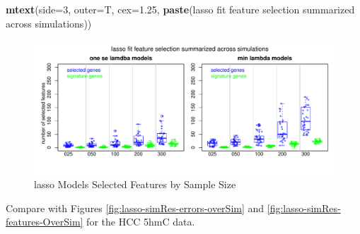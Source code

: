 \documentclass[
]{book}
\newenvironment{Shaded}{\begin{snugshade}}{\end{snugshade}}
\newcommand{\DataTypeTok}[1]{\textcolor[rgb]{0.13,0.29,0.53}{#1}}
\newcommand{\DecValTok}[1]{\textcolor[rgb]{0.00,0.00,0.81}{#1}}
\newcommand{\FloatTok}[1]{\textcolor[rgb]{0.00,0.00,0.81}{#1}}
\newcommand{\KeywordTok}[1]{\textcolor[rgb]{0.13,0.29,0.53}{\textbf{#1}}}
\newcommand{\NormalTok}[1]{#1}
\newcommand{\StringTok}[1]{\textcolor[rgb]{0.31,0.60,0.02}{#1}}
\begin{document}
\begin{Shaded}
\begin{Highlighting}[]
\KeywordTok{mtext}\NormalTok{(}\DataTypeTok{side=}\DecValTok{3}\NormalTok{, }\DataTypeTok{outer=}\NormalTok{T, }\DataTypeTok{cex=}\FloatTok{1.25}\NormalTok{, }\KeywordTok{paste}\NormalTok{(}\StringTok{\textquotesingle{}lasso fit feature selection summarized across simulations\textquotesingle{}}\NormalTok{))}
\end{Highlighting}
\end{Shaded}

\begin{figure}
\centering
\includegraphics{Static/figures/brca-rnaseq-lasso-simRes-features-OverSim-1.pdf}
\caption{\label{fig:brca-rnaseq-lasso-simRes-features-OverSim}lasso Models Selected Features by Sample Size}
\end{figure}

Compare with Figures
\ref{fig:lasso-simRes-errors-overSim}
and
\ref{fig:lasso-simRes-features-OverSim}
for the HCC 5hmC data.
\end{document}
